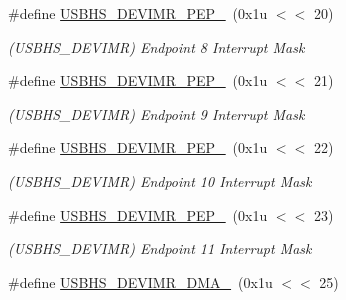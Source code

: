 \begin{DoxyCompactItemize}
\mbox{\label{group__SAMV71__USBHS_ga7c8704094858d52eea2afa2793403877}} 
\#define \mbox{\hyperlink{group__SAMV71__USBHS_ga7c8704094858d52eea2afa2793403877}{U\+S\+B\+H\+S\+\_\+\+D\+E\+V\+I\+M\+R\+\_\+\+P\+E\+P\+\_}}~(0x1u $<$$<$ 20)
\begin{DoxyCompactList}\small\item\em (U\+S\+B\+H\+S\+\_\+\+D\+E\+V\+I\+MR) Endpoint 8 Interrupt Mask \end{DoxyCompactList}\item 
\mbox{\label{group__SAMV71__USBHS_ga870c505db29e638559d066668532a7a5}} 
\#define \mbox{\hyperlink{group__SAMV71__USBHS_ga870c505db29e638559d066668532a7a5}{U\+S\+B\+H\+S\+\_\+\+D\+E\+V\+I\+M\+R\+\_\+\+P\+E\+P\+\_}}~(0x1u $<$$<$ 21)
\begin{DoxyCompactList}\small\item\em (U\+S\+B\+H\+S\+\_\+\+D\+E\+V\+I\+MR) Endpoint 9 Interrupt Mask \end{DoxyCompactList}\item 
\mbox{\label{group__SAMV71__USBHS_gacf5dcbb079ec3e4ec394ab4d1ec2e3f5}} 
\#define \mbox{\hyperlink{group__SAMV71__USBHS_gacf5dcbb079ec3e4ec394ab4d1ec2e3f5}{U\+S\+B\+H\+S\+\_\+\+D\+E\+V\+I\+M\+R\+\_\+\+P\+E\+P\+\_}}~(0x1u $<$$<$ 22)
\begin{DoxyCompactList}\small\item\em (U\+S\+B\+H\+S\+\_\+\+D\+E\+V\+I\+MR) Endpoint 10 Interrupt Mask \end{DoxyCompactList}\item 
\mbox{\label{group__SAMV71__USBHS_ga555e0be777ded08b48792e9b30baebd8}} 
\#define \mbox{\hyperlink{group__SAMV71__USBHS_ga555e0be777ded08b48792e9b30baebd8}{U\+S\+B\+H\+S\+\_\+\+D\+E\+V\+I\+M\+R\+\_\+\+P\+E\+P\+\_}}~(0x1u $<$$<$ 23)
\begin{DoxyCompactList}\small\item\em (U\+S\+B\+H\+S\+\_\+\+D\+E\+V\+I\+MR) Endpoint 11 Interrupt Mask \end{DoxyCompactList}\item 
\mbox{\label{group__SAMV71__USBHS_gaec1f297e81c46ad2484071b0bf34e859}} 
\#define \mbox{\hyperlink{group__SAMV71__USBHS_gaec1f297e81c46ad2484071b0bf34e859}{U\+S\+B\+H\+S\+\_\+\+D\+E\+V\+I\+M\+R\+\_\+\+D\+M\+A\+\_}}~(0x1u $<$$<$ 25)
$$
\end{DoxyCompactItemize}
